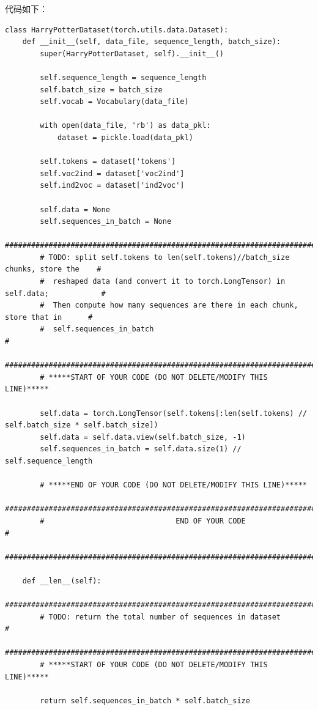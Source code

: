 \documentclass{article}%
\begin{document}
代码如下：
\begin{lstlisting}
class HarryPotterDataset(torch.utils.data.Dataset):
    def __init__(self, data_file, sequence_length, batch_size):
        super(HarryPotterDataset, self).__init__() 

        self.sequence_length = sequence_length
        self.batch_size = batch_size
        self.vocab = Vocabulary(data_file)

        with open(data_file, 'rb') as data_pkl:
            dataset = pickle.load(data_pkl)
        
        self.tokens = dataset['tokens']
        self.voc2ind = dataset['voc2ind']
        self.ind2voc = dataset['ind2voc']

        self.data = None
        self.sequences_in_batch = None
        ################################################################################
        # TODO: split self.tokens to len(self.tokens)//batch_size chunks, store the    #
        #  reshaped data (and convert it to torch.LongTensor) in self.data;            #
        #  Then compute how many sequences are there in each chunk, store that in      #
        #  self.sequences_in_batch                                                     #
        ################################################################################
        # *****START OF YOUR CODE (DO NOT DELETE/MODIFY THIS LINE)*****

        self.data = torch.LongTensor(self.tokens[:len(self.tokens) // self.batch_size * self.batch_size])
        self.data = self.data.view(self.batch_size, -1)
        self.sequences_in_batch = self.data.size(1) // self.sequence_length

        # *****END OF YOUR CODE (DO NOT DELETE/MODIFY THIS LINE)*****
        ################################################################################
        #                              END OF YOUR CODE                                #
        ################################################################################

    def __len__(self):
        ################################################################################
        # TODO: return the total number of sequences in dataset                        #
        ################################################################################
        # *****START OF YOUR CODE (DO NOT DELETE/MODIFY THIS LINE)*****
        
        return self.sequences_in_batch * self.batch_size


\end{lstlisting}
\end{document}
